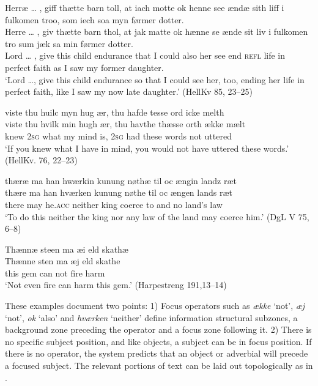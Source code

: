 \documentclass[output=paper]{langscibook}
\begin{document}
\begin{exe}
\ex \label{ex:heltoft:40} 
    \glll Herræ … , giff thætte barn toll, at iach motte ok henne see ændæ sith liff i fulkomen troo, som iech soa myn førmer dotter.\\
         Herre … , giv thætte barn thol, at jak matte    ok   hænne se ænde sit liv i fulkomen tro   sum   jæk sa     min førmer dotter.\\
         Lord … , give this child endurance  that I could also her see    end \textsc{refl} life  in perfect faith   as     I saw     my former daughter.\\
    \glt ‘Lord …, give this child endurance so that I could see her, too, ending her life in perfect faith, like I saw my now late daughter.'  (HellKv 85, 23--25)

\ex  \label{ex:heltoft:41} 
    \glll viste thu huilc myn hug ær, thu hafde tesse ord icke melth\\
         viste thu   hvilk min hugh ær,   thu     havthe thæsse orth   ække mælt\\
         knew \textsc{2sg}  what my mind is,   \textsc{2sg}   had   these words   not uttered\\
    \glt ‘If you knew what I have in mind, you would not have uttered these words.' (HellKv. 76, 22--23)

\ex \label{ex:heltoft:42} 
    \glll thæræ ma han hwærkin kunung nøthæ til oc ængin landz ræt\\
         thære   ma   han    hværken  kunung   nøthe   til     oc ængen   lands ræt\\
         there  may  he.\textsc{acc}   neither  king    coerce  to    and no    land's law\\
    \glt ‘To do this neither the king nor any law of the land may coerce him.' (DgL V 75, 6--8)

\ex \label{ex:heltoft:43}
    \glll Thænnæ steen ma æi eld skathæ\\
         Thænne sten   ma   æj     eld   skathe \\
         this gem    can    not    fire    harm \\
    \glt ‘Not even fire can harm this gem.' (Harpestreng 191,13--14)
\end{exe}

These examples document two points: 1) Focus operators such as \textit{ække} ‘not', \textit{æj} ‘not', \textit{ok} ‘also' and \textit{hværken} ‘neither' define information structural subzones, a background zone preceding the operator and a focus zone following it. 2) There is no specific subject position, and like objects, a subject can be in focus position. If there is no operator, the system predicts that an object or adverbial will precede a focused subject. The relevant portions of text can be laid out topologically as in .
\end{document}
